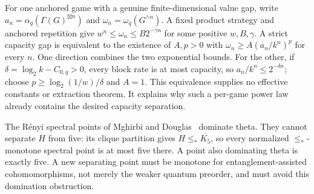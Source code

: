 \begin{remark}
For one anchored game with a genuine finite-dimensional value gap,
write $a_n=\alpha_q(\Gamma(G)^{\boxtimes n})$ and
$\omega_n=\omega_q(G^{\wedge n})$. A fixed product strategy and anchored
repetition give $w^n\le\omega_n\le B2^{-\gamma n}$ for some positive
$w,B,\gamma$. A strict capacity gap is equivalent to the existence of
$A,p>0$ with $\omega_n\ge A(a_n/k^n)^p$ for every $n$.
One direction combines the two exponential bounds. For the other, if
$\delta=\log_2k-C_{0,q}>0$, every block rate is at most capacity, so
$a_n/k^n\le2^{-\delta n}$; choose
$p\ge\log_2(1/w)/\delta$ and $A=1$. This equivalence supplies no effective
constants or extraction theorem. It explains why such a per-game power
law already contains the desired capacity separation.
\end{remark}

The R\'enyi spectral points of Mghirbi and Douglas~\cite{RenyiSpectrum}
dominate theta. They cannot separate $H$ from five: its clique partition
gives $H\le_*\overline{K_5}$, so every normalized
$\le_*$-monotone spectral point is at most five there. A point also
dominating theta is exactly five. A new separating point must be
monotone for entanglement-assisted cohomomorphisms, not merely the weaker
quantum preorder, and must avoid this domination obstruction.
